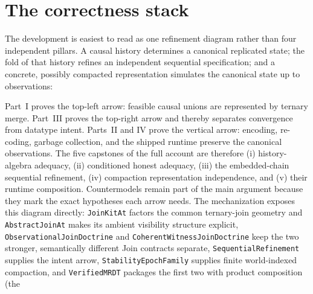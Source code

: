 \documentclass[11pt]{article}
\newcommand{\lean}[1]{\texttt{#1}}
\begin{document}
\section*{The correctness stack}
The development is easiest to read as one refinement diagram rather than four
independent pillars.  A causal history determines a canonical replicated
state; the fold of that history refines an independent sequential
specification; and a concrete, possibly compacted representation simulates the
canonical state up to observations:
\begin{center}
\end{center}
Part~I proves the top-left arrow: feasible causal unions are represented by
ternary merge.  Part~III proves the top-right arrow and thereby separates
convergence from datatype intent.  Parts~II and IV prove the vertical arrow:
encoding, re-coding, garbage collection, and the shipped runtime preserve the
canonical observations.  The five capstones of the full account are therefore
(i) history-algebra adequacy, (ii) conditioned honest adequacy, (iii) the
embedded-chain sequential refinement, (iv) compaction representation
independence, and (v) their runtime composition.  Countermodels remain part of
the main argument because they mark the exact hypotheses each arrow needs.
The mechanization exposes this diagram directly:
\lean{JoinKitAt} factors the common ternary-join geometry and
\lean{AbstractJoinAt} makes its ambient visibility structure explicit,
\lean{ObservationalJoinDoctrine} and
\lean{CoherentWitnessJoinDoctrine} keep the two stronger, semantically
different Join contracts separate,
\lean{SequentialRefinement} supplies the intent arrow,
\lean{StabilityEpochFamily} supplies finite world-indexed compaction, and
\lean{VerifiedMRDT} packages the first two with product composition (the
\end{document}
